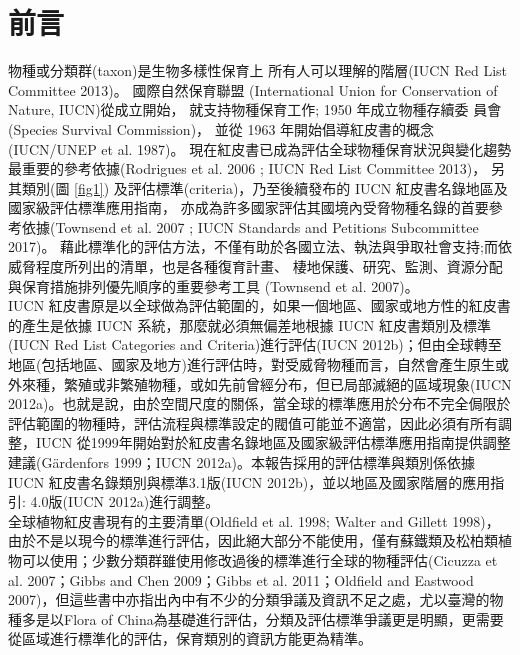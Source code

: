 \chapter{前言}

\linespread{1.5}\selectfont
\begin{multicols}{2}
物種或分類群(taxon)是生物多樣性保育上 所有人可以理解的階層(IUCN Red List Committee 2013)。
國際自然保育聯盟 (International Union for Conservation of Nature, IUCN)從成立開始，
就支持物種保育工作; 1950 年成立物種存續委 員會(Species Survival Commission)，
並從 1963 年開始倡導紅皮書的概念(IUCN/UNEP et al. 1987)。
現在紅皮書已成為評估全球物種保育狀況與變化趨勢最重要的參考依據(Rodrigues et al. 2006 ; IUCN Red List Committee 2013)，
另其類別(圖 \ref{fig1}) 及評估標準(criteria)，乃至後續發布的 IUCN 紅皮書名錄地區及國家級評估標準應用指南，
亦成為許多國家評估其國境內受脅物種名錄的首要參考依據(Townsend et al. 2007 ; IUCN Standards and Petitions Subcommittee 2017)。
藉此標準化的評估方法，不僅有助於各國立法、執法與爭取社會支持;而依威脅程度所列出的清單，也是各種復育計畫、
棲地保護、研究、監測、資源分配與保育措施排列優先順序的重要參考工具 (Townsend et al. 2007)。\\

IUCN 紅皮書原是以全球做為評估範圍的，如果一個地區、國家或地方性的紅皮書的產生是依據 IUCN 系統，那麼就必須無偏差地根據 IUCN 紅皮書類別及標準(IUCN Red List Categories and Criteria)進行評估(IUCN 2012b)；但由全球轉至地區(包括地區、國家及地方)進行評估時，對受威脅物種而言，自然會產生原生或外來種，繁殖或非繁殖物種，或如先前曾經分布，但已局部滅絕的區域現象(IUCN 2012a)。也就是說，由於空間尺度的關係，當全球的標準應用於分布不完全侷限於評估範圍的物種時，評估流程與標準設定的閥值可能並不適當，因此必須有所有調整，IUCN 從1999年開始對於紅皮書名錄地區及國家級評估標準應用指南提供調整建議(Gärdenfors 1999；IUCN 2012a)。本報告採用的評估標準與類別係依據 IUCN 紅皮書名錄類別與標準3.1版(IUCN 2012b)，並以地區及國家階層的應用指引: 4.0版(IUCN 2012a)進行調整。\\

全球植物紅皮書現有的主要清單(Oldfield et al. 1998; Walter and Gillett 1998)，由於不是以現今的標準進行評估，因此絕大部分不能使用，僅有蘇鐵類及松柏類植物可以使用；少數分類群雖使用修改過後的標準進行全球的物種評估(Cicuzza et al. 2007；Gibbs and Chen 2009；Gibbs et al. 2011；Oldfield and Eastwood 2007)，但這些書中亦指出內中有不少的分類爭議及資訊不足之處，尤以臺灣的物種多是以Flora of China為基礎進行評估，分類及評估標準爭議更是明顯，更需要從區域進行標準化的評估，保育類別的資訊方能更為精準。 \\


\end{multicols}
